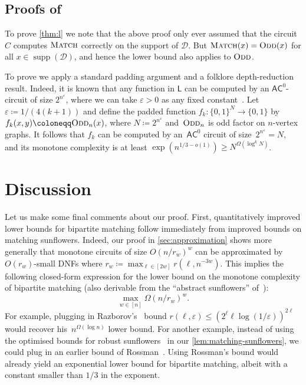 \documentclass[11pt]{article}
\theoremstyle{plain}
\theoremstyle{definition}
\theoremstyle{remark}
\newcommand{\eps}{\varepsilon}
\newcommand{\PM}{\textsc{Match}}
\newcommand{\Odd}{\textsc{Odd}}
\newcommand{\complexityfont}[1]{\mathsf{#1}}
\def\AC           {\complexityfont{AC}}
\renewcommand{\L} {\complexityfont{L}}
\def\cald{{\mathcal D}}
\begin{document}
\subsection{Proofs of \texorpdfstring{}{Theorems \ref{thm:l} and \ref{thm:ac0}}}
\label{s:grigni-sipser}

To prove \cref{thm:l} we note that the above proof only ever
assumed that the circuit~$C$ computes $\PM$ correctly on the support of
$\cald$. But $\PM(x)=\Odd(x)$ for all $x\in\operatorname{supp}(\cald)$, and
hence the lower bound also applies to $\Odd$.

To prove  we apply a standard padding argument and a folklore
depth-reduction result. Indeed, it is known that any function in $\L$ can
be computed by an $\AC^0$-circuit of size $2^{n^\eps}$, where we can take
$\eps>0$ as any fixed constant~\cite[Lemma 8.1]{Allender2008}. Let~$\eps
\coloneqq 1/(4(k+1))$ and define the padded function $f_k\colon \{0,1\}^N \to
\{0,1\}$ by $f_k(x,y) \coloneqq \Odd_n(x)$, where $N \coloneqq 2^{n^\eps}$ and~$\Odd_n$ is odd factor on $n$-vertex graphs. It follows that $f_k$ can be
computed by an~$\AC^0$ circuit of size~$2^{n^\eps} = N$, and its monotone
complexity is at least $\exp(n^{1/3-o(1)}) \geq N^{\Omega(\log^k N)}$.



\section{Discussion}

Let us make some final comments about our proof.
First, quantitatively improved lower bounds for bipartite matching follow immediately from improved bounds on matching sunflowers.
Indeed, our proof in \cref{sec:approximation} shows more generally that monotone circuits of size $O(n/r_w)^w$
can be approximated by $O(r_w)$-small DNFs where $r_w \coloneqq \max_{\ell
\in [2w]} r(\ell,n^{-3w})$. This implies the following closed-form
expression for the lower bound on the monotone complexity of bipartite
matching (also derivable from the ``abstract sunflowers'' of~\cite{Cavalar2020a}):
\begin{equation*}
    \max_{w \in [n]}
    \Omega(n/ r_w)^w.
\end{equation*}
For example, plugging in Razborov's~\cite{Razborov1985} bound  $r(\ell,\eps) \leq (2^\ell \ell \log(1/\eps))^{2\ell}$ would recover his~$n^{\Omega(\log n)}$ lower bound.
For another example, instead of using the optimised bounds for robust
sunflowers~\cite{Alweiss2021,Rao2020,bcw21} in our
\cref{lem:matching-sunflowers}, we could plug in an earlier bound of
Rossman~\cite{Rossman2014}. 
Using Rossman's bound  would already yield an
exponential lower bound for bipartite matching, albeit with a constant smaller than $1/3$ in the exponent.
\end{document}
